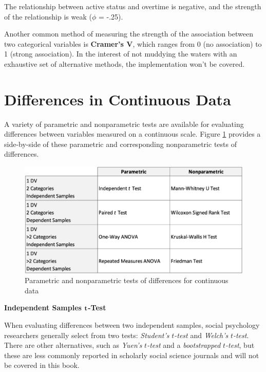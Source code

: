 \documentclass[
]{book}
\begin{document}
The relationship between active status and overtime is negative, and the strength of the relationship is weak (\(\phi\) = -.25).

Another common method of measuring the strength of the association between two categorical variables is \textbf{Cramer's V}, which ranges from 0 (no association) to 1 (strong association). In the interest of not muddying the waters with an exhaustive set of alternative methods, the implementation won't be covered.

\hypertarget{differences-in-continuous-data}{%
\section{Differences in Continuous Data}\label{differences-in-continuous-data}}

A variety of parametric and nonparametric tests are available for evaluating differences between variables measured on a continuous scale. Figure \ref{fig:continuous-tests} provides a side-by-side of these parametric and corresponding nonparametric tests of differences.

\begin{figure}

{\centering \includegraphics[width=1\linewidth]{graphics/continuous_differences_test_table} 

}

\caption{Parametric and nonparametric tests of differences for continuous data}\label{fig:continuous-tests}
\end{figure}

\textbf{Independent Samples }\(\textbf t\)\textbf{-Test}

When evaluating differences between two independent samples, social psychology researchers generally select from two tests: \emph{Student's} \(t\)\emph{-test} and \emph{Welch's} \(t\)\emph{-test}. There are other alternatives, such as \emph{Yuen's} \(t\)\emph{-test} and a \emph{bootstrapped} \(t\)\emph{-test}, but these are less commonly reported in scholarly social science journals and will not be covered in this book.
\end{document}
